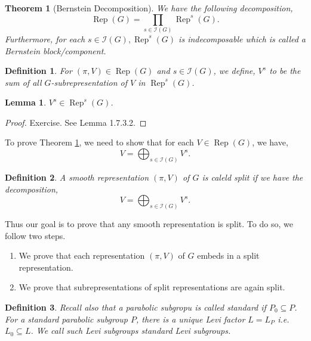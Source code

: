 \documentclass[8pt]{article}
\newtheorem{theorem}{Theorem} [section]
\newtheorem{definition}{Definition}[section]
\newtheorem{lemma}{Lemma}[section]
\DeclareMathOperator{\Rep}{Rep}
\begin{document}
\begin{theorem}[Bernstein Decomposition]
  \label{theorem_85}
  We have the following decomposition,
  \begin{equation*}
    \Rep(G) = \prod_{s\in\mathcal{I}(G)}\Rep^s(G).
  \end{equation*}
  Furthermore, for each $s\in \mathcal{I}(G),\Rep^s(G)$ is indecomposable which is called a Bernstein block/component.
\end{theorem}

\begin{definition}
  For $(\pi,V)\in\Rep(G)$ and $s\in\mathcal{I}(G)$, we define, $V^s$ to be the sum of all $G$-subrepresentation of $V$ in $\Rep^s(G)$.
\end{definition}

\begin{lemma}
  $V^s\in\Rep^s(G)$.
\end{lemma}
\begin{proof}
  Exercise. See \cite{Roche} Lemma 1.7.3.2.
\end{proof}

To prove Theorem \ref{theorem_85}, we need to show that for each $V\in\Rep(G)$, we have,
\begin{equation*}
  V= \bigoplus_{s\in\mathcal{I}(G)}V^s.
\end{equation*}

\begin{definition}
  A smooth representation $(\pi,V)$ of $G$ is caleld split if we have the decomposition,
  \begin{equation*}
  V= \bigoplus_{s\in\mathcal{I}(G)}V^s.
\end{equation*}
\end{definition}

Thus our goal is to prove that any smooth representation is split. To do so, we follow two steps. 
\begin{enumerate}[Step 1.]
  \item We prove that each representation $(\pi,V)$ of $G$ embeds in a split representation.
  \item We prove that subrepresentations of split representations are again split.
\end{enumerate}

\begin{definition}
  Recall also that a parabolic subgropu is called standard if $P_0\subseteq P$. For a standard parabolic subgroup $P$, there is a unique Levi factor $L= L_P$ i.e. $L_0\subseteq L$. We call such Levi subgroups standard Levi subgroups.
\end{definition}
\end{document}
